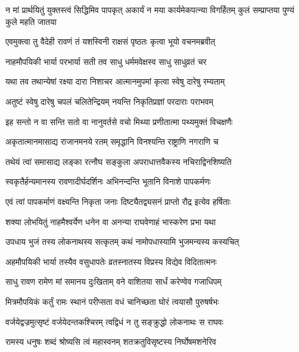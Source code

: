 \threelineshloka
{न मां प्रार्थयितुं युक्तस्त्वं सिद्धिमिव पापकृत्}
{अकार्यं न मया कार्यमेकपत्न्या विगर्हितम्}
{कुलं सम्प्राप्तया पुण्यं कुले महति जातया} %

\twolineshloka
{एवमुक्त्वा तु वैदेही रावणं तं यशस्विनी}
{राक्षसं पृष्ठतः कृत्वा भूयो वचनमब्रवीत्} %

\twolineshloka
{नाहमौपयिकी भार्या परभार्या सती तव}
{साधु धर्ममवेक्षस्व साधु साधुव्रतं चर} %

\twolineshloka
{यथा तव तथान्येषां रक्ष्या दारा निशाचर}
{आत्मानमुपमां कृत्वा स्वेषु दारेषु रम्यताम्} %

\twolineshloka
{अतुष्टं स्वेषु दारेषु चपलं चलितेन्द्रियम्}
{नयन्ति निकृतिप्रज्ञां परदाराः पराभवम्} %

\twolineshloka
{इह सन्तो न वा सन्ति सतो वा नानुवर्तसे}
{वचो मिथ्या प्रणीतात्मा पथ्यमुक्तं विचक्षणैः} %

\twolineshloka
{अकृतात्मानमासाद्य राजानमनये रतम्}
{समृद्धानि विनश्यन्ति राष्ट्राणि नगराणि च} %

\twolineshloka
{तथेयं त्वां समासाद्य लङ्का रत्नौघ सङ्कुला}
{अपराधात्तवैकस्य नचिराद्विनशिष्यति} %

\twolineshloka
{स्वकृतैर्हन्यमानस्य रावणादीर्घदर्शिनः}
{अभिनन्दन्ति भूतानि विनाशे पापकर्मणः} %

\twolineshloka
{एवं त्वां पापकर्माणं वक्ष्यन्ति निकृता जनाः}
{दिष्ट्यैतद्व्यसनं प्राप्तो रौद्र इत्येव हर्षिताः} %

\twolineshloka
{शक्या लोभयितुं नाहमैश्वर्येण धनेन वा}
{अनन्या राघवेणाहं भास्करेण प्रभा यथा} %

\twolineshloka
{उपधाय भुजं तस्य लोकनाथस्य सत्कृतम्}
{कथं नामोपधास्यामि भुजमन्यस्य कस्यचित्} %

\twolineshloka
{अहमौपयिकी भार्या तस्यैव वसुधापतेः}
{व्रतस्नातस्य विप्रस्य विद्येव विदितात्मनः} %

\twolineshloka
{साधु रावण रामेण मां समानय दुःखिताम्}
{वने वाशितया सार्धं करेण्वेव गजाधिपम्} %

\twolineshloka
{मित्रमौपयिकं कर्तुं रामः स्थानं परीप्सता}
{वधं चानिच्छता घोरं त्वयासौ पुरुषर्षभः} %

\twolineshloka
{वर्जयेद्वज्रमुत्सृष्टं वर्जयेदन्तकश्चिरम्}
{त्वद्विधं न तु सङ्क्रुद्धो लोकनाथः स राघवः} %

\twolineshloka
{रामस्य धनुषः शब्दं श्रोष्यसि त्वं महास्वनम्}
{शतक्रतुविसृष्टस्य निर्घोषमशनेरिव} %

